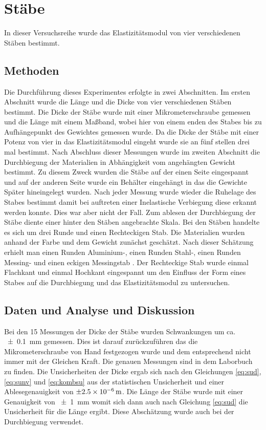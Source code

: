 \section{Stäbe}
In dieser Versuchsreihe wurde das Elastizitätsmodul von vier verschiedenen Stäben bestimmt.
\subsection{Methoden}
Die Durchführung dieses Experimentes erfolgte in zwei Abschnitten.
Im ersten Abschnitt wurde die Länge und die Dicke von vier verschiedenen Stäben bestimmt.
Die Dicke der Stäbe wurde mit einer Mikrometerschraube gemessen und die Länge mit einem Maßband, wobei hier von einem enden des Stabes bis zu Aufhängepunkt des Gewichtes gemessen wurde.
Da die Dicke der Stäbe mit einer Potenz von vier in das Elastizitätsmodul eingeht wurde sie an fünf stellen drei mal bestimmt.  Nach Abschluss dieser Messungen wurde im zweiten Abschnitt die Durchbiegung der Materialien in Abhängigkeit vom angehängten Gewicht bestimmt. Zu diesem Zweck wurden die Stäbe auf der einen Seite eingespannt und auf der anderen Seite wurde ein Behälter eingehängt in das die Gewichte Später hineingelegt wurden.
Nach jeder Messung wurde wieder die Ruhelage des Stabes bestimmt damit bei auftreten einer Inelastische Verbiegung diese erkannt werden konnte. Dies war aber nicht der Fall. Zum ablesen der Durchbiegung der Stäbe diente einer hinter den Stäben angebrachte Skala.
Bei den Stäben handelte es sich um drei Runde und einen Rechteckigen Stab. Die Materialien wurden anhand der Farbe und dem Gewicht zunächst geschätzt.
Nach dieser Schätzung erhielt man einen Runden Aluminium-, einen Runden Stahl-, einen Runden Messing- und einen eckigen Messingstab . Der Rechteckige Stab wurde einmal Flachkant und einmal Hochkant eingespannt um den Einfluss der Form eines Stabes auf die Durchbiegung und das Elastizitätsmodul zu untersuchen.

\subsection{Daten und Analyse und Diskussion}
Bei  den 15 Messungen der Dicke der Stäbe wurden Schwankungen um ca. \SI{+-0,1}{mm} gemessen. Dies ist darauf zurückzuführen das die Mikrometerschraube von Hand festgezogen wurde und dem entsprechend nicht immer mit der Gleichen Kraft.
Die genauen Messungen sind in dem Laborbuch zu finden. Die Unsicherheiten der Dicke ergab sich nach den Gleichungen \ref{eq:sud}, \ref{eq:sunv} und \ref{eq:kombsu} aus der statistischen Unsicherheit und einer Ablesegenauigkeit von $\SI{\pm 2.5e-6}{m}$.   
Die Länge der Stäbe wurde mit einer Genauigkeit von \SI{+-1}{mm} womit sich dann auch nach Gleichung \ref{eq:sud} die Unsicherheit für die Länge ergibt. Diese Abschätzung wurde auch bei der Durchbiegung verwendet.

